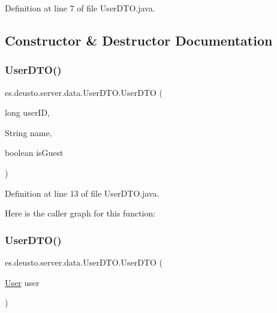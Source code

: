 Definition at line 7 of file User\+D\+T\+O.\+java.



\subsection{Constructor \& Destructor Documentation}
\mbox{\label{classes_1_1deusto_1_1server_1_1data_1_1_user_d_t_o_a00e605694b6157bcf7a1acc5e2adc735}} 
\subsubsection{\texorpdfstring{UserDTO()}{UserDTO()}\hspace{0.1cm}{\footnotesize\ttfamily [1/2]}}
{\footnotesize\ttfamily es.\+deusto.\+server.\+data.\+User\+D\+T\+O.\+User\+D\+TO (\begin{DoxyParamCaption}\item[{long}]{user\+ID,  }\item[{String}]{name,  }\item[{boolean}]{is\+Guest }\end{DoxyParamCaption})}



Definition at line 13 of file User\+D\+T\+O.\+java.

Here is the caller graph for this function\+:
\mbox{\label{classes_1_1deusto_1_1server_1_1data_1_1_user_d_t_o_ab05044a5b24bdbdcc1bbe582b7268b71}} 
\subsubsection{\texorpdfstring{UserDTO()}{UserDTO()}\hspace{0.1cm}{\footnotesize\ttfamily [2/2]}}
{\footnotesize\ttfamily es.\+deusto.\+server.\+data.\+User\+D\+T\+O.\+User\+D\+TO (\begin{DoxyParamCaption}\item[{\mbox{\hyperlink{classes_1_1deusto_1_1server_1_1jdo_1_1_user}{User}}}]{user }\end{DoxyParamCaption})}



